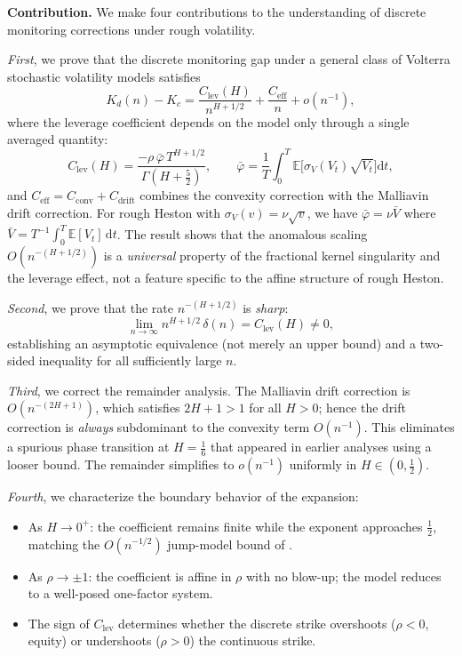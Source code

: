 \documentclass[12pt]{article}
\theoremstyle{definition}
\newcommand{\E}{\mathbb{E}}
\newcommand{\dd}{\mathrm{d}}
\begin{document}
\medskip

\noindent\textbf{Contribution.}
We make four contributions to the understanding of discrete monitoring
corrections under rough volatility.

\emph{First}, we prove that the discrete monitoring gap under a
general class of Volterra stochastic volatility models satisfies
\begin{equation}\label{eq:main-result-preview}
  K_d(n) - K_c
  = \frac{C_{\mathrm{lev}}(H)}{n^{H+1/2}}
  + \frac{C_{\mathrm{eff}}}{n}
  + o(n^{-1}),
\end{equation}
where the leverage coefficient depends on the model only through a
single averaged quantity:
\begin{equation}\label{eq:Clev-preview}
  C_{\mathrm{lev}}(H)
  = \frac{-\rho\,\bar\varphi\,T^{H+1/2}}{\Gamma(H+\tfrac52)},
  \qquad
  \bar\varphi = \frac{1}{T}\int_0^T
    \E\bigl[\sigma_V(V_t)\sqrt{V_t}\bigr]\dd t,
\end{equation}
and $C_{\mathrm{eff}} = C_{\mathrm{conv}} + C_{\mathrm{drift}}$
combines the convexity correction with the Malliavin drift correction.
For rough Heston with $\sigma_V(v) = \nu\sqrt{v}$,
we have $\bar\varphi = \nu\bar V$ where
$\bar V = T^{-1}\!\int_0^T\!\E[V_t]\,\dd t$.
The result shows that the anomalous scaling $O(n^{-(H+1/2)})$
is a \emph{universal} property of the fractional kernel singularity
and the leverage effect, not a feature specific to the affine structure
of rough Heston.

\emph{Second}, we prove that the rate $n^{-(H+1/2)}$ is \emph{sharp}:
\begin{equation}\label{eq:sharpness-preview}
  \lim_{n\to\infty} n^{H+1/2}\,\delta(n) = C_{\mathrm{lev}}(H) \neq 0,
\end{equation}
establishing an asymptotic equivalence (not merely an upper bound) and
a two-sided inequality for all sufficiently large $n$.

\emph{Third}, we correct the remainder analysis.
The Malliavin drift correction is $O(n^{-(2H+1)})$, which satisfies
$2H + 1 > 1$ for all $H > 0$; hence the drift correction is
\emph{always} subdominant to the convexity term $O(n^{-1})$.
This eliminates a spurious phase transition at $H = \tfrac16$
that appeared in earlier analyses using a looser bound.
The remainder simplifies to $o(n^{-1})$ uniformly in
$H \in (0,\tfrac12)$.

\emph{Fourth}, we characterize the boundary behavior of the expansion:
\begin{itemize}[nosep]
\item As $H \to 0^+$: the coefficient remains finite while the exponent
  approaches $\tfrac12$, matching the $O(n^{-1/2})$ jump-model bound of
  \citet{JarrowKchiaProtte2013}.
\item As $\rho \to \pm 1$: the coefficient is affine in $\rho$ with no
  blow-up; the model reduces to a well-posed one-factor system.
\item The sign of $C_{\mathrm{lev}}$ determines whether the discrete
  strike overshoots ($\rho < 0$, equity) or undershoots ($\rho > 0$)
  the continuous strike.
\end{itemize}
\end{document}
